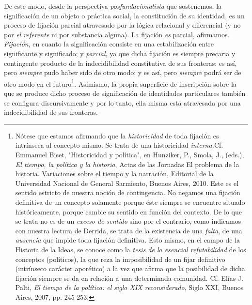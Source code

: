 \documentclass{book}
\begin{document}
De este modo, desde la perspectiva \emph{posfundacionalista} que
sostenemos, la significación de un objeto o práctica social, la
constitución de su identidad, es un proceso de fijación parcial
atravesado por la lógica relacional y diferencial (y no por \emph{el
referente} ni por substancia alguna). La fijación \emph{es} parcial,
afirmamos. \emph{Fijación}, en cuanto la significación consiste en una
estabilización entre significante y significado; y \emph{parcial}, ya
que dicha fijación es siempre precaria y contingente producto de la
indecidibilidad constitutiva de sus fronteras: es así, pero
\emph{siempre} pudo haber sido de otro modo; y es así, pero
\emph{siempre} podrá ser de otro modo en el futuro\footnote{Nótese que
  estamos afirmando que la \emph{historicidad} de toda fijación es
  intrínseca al concepto mismo. Se trata de una historicidad
  \emph{interna.}Cf. Emmanuel Biset, "Historicidad y política", en
  Hunziker, P., Smola, J., (eds.), \emph{El tiempo, la política y la
  historia}, Actas de las Jornadas El problema de la historia.
  Variaciones sobre el tiempo y la narración, Editorial de la
  Universidad Nacional de General Sarmiento, Buenos Aires, 2010. Este es
  el sentido estricto de nuestra noción de contingencia. No negamos una
  fijación definitiva de un concepto solamente porque éste siempre se
  encuentre situado históricamente, porque cambie su sentido en función
  del contexto. De lo que se trata no es de un \emph{exceso de sentido}
  sino por el contrario, como indicamos con nuestra lectura de Derrida,
  se trata de la existencia de una \emph{falta}, de una \emph{ausencia}
  que impide toda fijación definitiva. Esto mismo, en el campo de la
  Historia de la Ideas, se conoce como la \emph{tesis de la esencial
  refutabilidad} de los conceptos (políticos), la que reza la
  imposibilidad de un fijar definitivo (intrínseco carácter aporético) a
  la vez que afirma que la posibilidad de dicha fijación siempre se da
  en relación a una determinada comunidad. Cf. Elías J. Palti, \emph{El
  tiempo de la política: el siglo XIX reconsiderado}, Siglo XXI, Buenos
  Aires, 2007, pp. 245-253.}. Asimismo, la propia superficie de
inscripción sobre la que se produce dicho proceso de significación de
identidades particulares también se configura discursivamente y por lo
tanto, ella misma está atravesada por una indecidibilidad de sus
fronteras.
\end{document}
